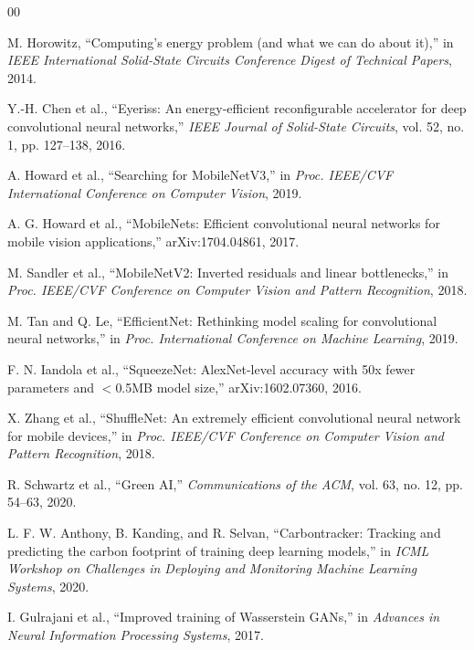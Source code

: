 \documentclass[conference]{IEEEtran}
\begin{document}
\begin{thebibliography}{00}

M. Horowitz, ``Computing's energy problem (and what we can do about it),''
in \emph{IEEE International Solid-State Circuits Conference Digest of
Technical Papers}, 2014.

Y.-H. Chen et al., ``Eyeriss: An energy-efficient reconfigurable accelerator
for deep convolutional neural networks,'' \emph{IEEE Journal of Solid-State
Circuits}, vol. 52, no. 1, pp. 127--138, 2016.

A. Howard et al., ``Searching for MobileNetV3,'' in \emph{Proc. IEEE/CVF
International Conference on Computer Vision}, 2019.

A. G. Howard et al., ``MobileNets: Efficient convolutional neural networks
for mobile vision applications,'' arXiv:1704.04861, 2017.

M. Sandler et al., ``MobileNetV2: Inverted residuals and linear
bottlenecks,'' in \emph{Proc. IEEE/CVF Conference on Computer Vision and
Pattern Recognition}, 2018.

M. Tan and Q. Le, ``EfficientNet: Rethinking model scaling for convolutional
neural networks,'' in \emph{Proc. International Conference on Machine
Learning}, 2019.

F. N. Iandola et al., ``SqueezeNet: AlexNet-level accuracy with 50x fewer
parameters and $<$0.5MB model size,'' arXiv:1602.07360, 2016.

X. Zhang et al., ``ShuffleNet: An extremely efficient convolutional neural
network for mobile devices,'' in \emph{Proc. IEEE/CVF Conference on Computer
Vision and Pattern Recognition}, 2018.

R. Schwartz et al., ``Green AI,'' \emph{Communications of the ACM}, vol. 63,
no. 12, pp. 54--63, 2020.

L. F. W. Anthony, B. Kanding, and R. Selvan, ``Carbontracker: Tracking and
predicting the carbon footprint of training deep learning models,'' in
\emph{ICML Workshop on Challenges in Deploying and Monitoring Machine
Learning Systems}, 2020.

I. Gulrajani et al., ``Improved training of Wasserstein GANs,'' in
\emph{Advances in Neural Information Processing Systems}, 2017.

\end{thebibliography}
\end{document}
